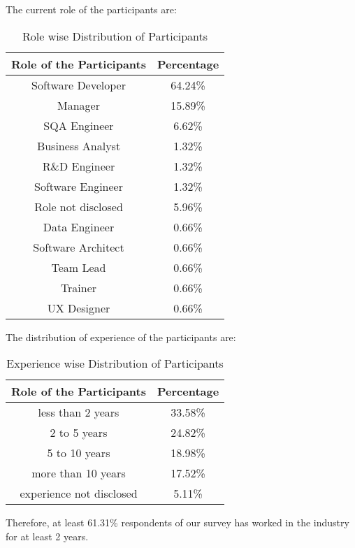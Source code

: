The current role of the participants are: 
\begin{table}[h]
\centering
\begin{tabular}{|c|c|}
\hline
\textbf{Role of the Participants} & \textbf{Percentage}\\
\hline
Software Developer & 64.24\%\\ 
Manager & 15.89\%\\ 
SQA Engineer & 6.62\%\\
Business Analyst & 1.32\%\\
R\&D Engineer & 1.32\%\\
Software Engineer & 1.32\%\\
Role not disclosed & 5.96\%\\
Data Engineer & 0.66\%\\
Software Architect & 0.66\%\\
Team Lead & 0.66\%\\
Trainer & 0.66\%\\
UX Designer & 0.66\%\\
\hline
\end{tabular}
\caption{Role wise Distribution of Participants} \label{tab:role}
\end{table}

The distribution of experience of the participants are:
\begin{table}[h]
\centering
\begin{tabular}{|c|c|}
\hline
\textbf{Role of the Participants} & \textbf{Percentage}\\
\hline
less than 2 years & 33.58\%\\ 
2 to 5 years & 24.82\%\\ 
5 to 10 years & 18.98\%\\
more than 10 years & 17.52\%\\
experience not disclosed & 5.11\%\\
\hline
\end{tabular}
\caption{Experience wise Distribution of Participants} \label{tab:experience}
\end{table}

Therefore, at least 61.31\% respondents of our survey has worked in the industry for at least 2 years.



